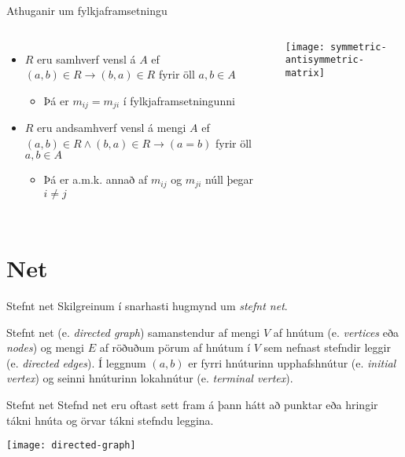 \documentclass{beamer}
\begin{document}
\begin{frame}{Athuganir um fylkjaframsetningu}
\begin{columns}
\begin{itemize}
 \item $R$ eru samhverf vensl á $A$ ef $(a,b) \in R \to (b, a) \in R$ fyrir öll $a, b \in A$
 \begin{itemize}
  \item Þá er $m_{ij} = m_{ji}$ í fylkjaframsetningunni
 \end{itemize}
 \item $R$ eru andsamhverf vensl á mengi $A$ ef $(a, b) \in R \land (b, a) \in R \to (a = b)$ fyrir öll $a, b \in A$
 \begin{itemize}
  \item Þá er a.m.k. annað af $m_{ij}$ og $m_{ji}$ núll þegar $i\neq j$ 
 \end{itemize}

\end{itemize}
\texttt{[image: symmetric-antisymmetric-matrix]}
\end{columns}
\end{frame}

\section{Net}

\begin{frame}{Stefnt net}
Skilgreinum í snarhasti hugmynd um \emph{stefnt net}.
\begin{tcolorbox}[title=Stefnt net]
Stefnt net (e. \emph{directed graph}) samanstendur af mengi $V$ af hnútum (e. \emph{vertices} eða \emph{nodes}) og mengi $E$ af röðuðum pörum af hnútum í $V$ sem nefnast stefndir leggir (e. \emph{directed edges}). Í leggnum $(a, b)$ er fyrri hnúturinn upphafshnútur (e. \emph{initial vertex}) og seinni hnúturinn lokahnútur (e. \emph{terminal vertex}).
\end{tcolorbox}
\end{frame}

\begin{frame}{Stefnt net}
Stefnd net eru oftast sett fram á þann hátt að punktar eða hringir tákni hnúta og örvar tákni stefndu leggina.

\begin{center}
\texttt{[image: directed-graph]}
\end{center}

\end{frame}
\end{document}
